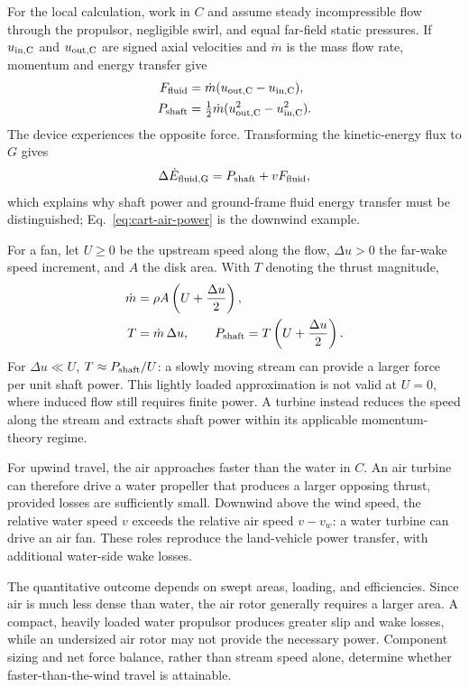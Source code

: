 \documentclass[reprint,aps,pra,longbibliography]{revtex4-2}
\begin{document}
For the local calculation, work in \(C\) and assume steady incompressible flow through the propulsor, negligible swirl, and equal far-field static pressures. If \(u_{\rm in,C}\) and \(u_{\rm out,C}\) are signed axial velocities and \(\dot m\) is the mass flow rate, momentum and energy transfer give
\begin{align}
F_{\rm fluid}&=\dot m(u_{\rm out,C}-u_{\rm in,C}),
\label{eq:fluid-force}\\
P_{\rm shaft}&=\tfrac12\dot m(u_{\rm out,C}^2-u_{\rm in,C}^2).
\label{eq:fluid-shaft-power}
\end{align}
The device experiences the opposite force. Transforming the kinetic-energy flux to \(G\) gives
\begin{equation}
\Delta\dot E_{\rm fluid,G}=P_{\rm shaft}+vF_{\rm fluid},
\label{eq:fluid-frame-power}
\end{equation}
which explains why shaft power and ground-frame fluid energy transfer must be distinguished; Eq.~\eqref{eq:cart-air-power} is the downwind example.

For a fan, let \(U\geq0\) be the upstream speed along the flow, \(\Delta u>0\) the far-wake speed increment, and \(A\) the disk area. With \(T\) denoting the thrust magnitude,
\begin{align}
\dot m&=\rho A\left(U+\frac{\Delta u}{2}\right),
\label{eq:fluid-mass-flow}\\
T&=\dot m\,\Delta u,\qquad
P_{\rm shaft}=T\left(U+\frac{\Delta u}{2}\right).
\label{eq:fluid-disk-power}
\end{align}
For \(\Delta u\ll U\), \(T\approx P_{\rm shaft}/U\): a slowly moving stream can provide a larger force per unit shaft power. This lightly loaded approximation is not valid at \(U=0\), where induced flow still requires finite power. A turbine instead reduces the speed along the stream and extracts shaft power within its applicable momentum-theory regime.

For upwind travel, the air approaches faster than the water in \(C\). An air turbine can therefore drive a water propeller that produces a larger opposing thrust, provided losses are sufficiently small. Downwind above the wind speed, the relative water speed \(v\) exceeds the relative air speed \(v-v_w\): a water turbine can drive an air fan. These roles reproduce the land-vehicle power transfer, with additional water-side wake losses.

The quantitative outcome depends on swept areas, loading, and efficiencies. Since air is much less dense than water, the air rotor generally requires a larger area. A compact, heavily loaded water propulsor produces greater slip and wake losses, while an undersized air rotor may not provide the necessary power. Component sizing and net force balance, rather than stream speed alone, determine whether faster-than-the-wind travel is attainable.
\end{document}
